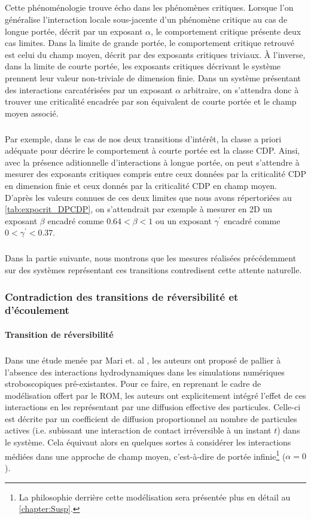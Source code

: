 \subparagraph{}Cette phénoménologie trouve écho dans les phénomènes critiques. Lorsque l'on généralise l'interaction locale sous-jacente d'un phénomène critique au cas de longue portée, décrit par un exposant $\alpha$, le comportement critique présente deux cas limites. Dans la limite de grande portée, le comportement critique retrouvé est celui du champ moyen, décrit par des exposants critiques triviaux. \`A l'inverse, dans la limite de courte portée, les exposants critiques décrivant le système prennent leur valeur non-triviale de dimension finie. Dans un système présentant des interactions carcatérisées par un exposant $\alpha$ arbitraire, on s'attendra donc à trouver une criticalité encadrée par son équivalent de courte portée et le champ moyen associé.

\subparagraph{}Par exemple, dans le cas de nos deux transitions d'intérêt, la classe a priori adéquate pour décrire le comportement à courte portée est la classe CDP. Ainsi, avec la présence aditionnelle d'interactions à longue portée, on peut s'attendre à mesurer des exposants critiques compris entre ceux données par la criticalité CDP en dimension finie et ceux donnés par la criticalité CDP en champ moyen. D'après les valeurs connues de ces deux limites que nous avons répertoriées au \autoref{tab:expocrit_DPCDP}, on s'attendrait par exemple à mesurer en 2D un exposant $\beta$ encadré comme $0.64 < \beta < 1$ ou un exposant $\gamma^\prime$ encadré comme $0 < \gamma^\prime < 0.37$.

\subparagraph{}Dans la partie suivante, nous montrons que les mesures réalisées précédemment sur des systèmes représentant ces transitions contredisent cette attente naturelle.

\subsubsection{Contradiction des transitions de réversibilité et d'écoulement}

\paragraph{Transition de réversibilité}

\subparagraph{}Dans une étude menée par Mari et. al \cite{mari_absorbing_2022}, les auteurs ont proposé de pallier à l'absence des interactions hydrodynamiques dans les simulations numériques stroboscopiques pré-existantes. Pour ce faire, en reprenant le cadre de modélisation offert par le ROM, les auteurs ont explicitement intégré l'effet de ces interactions en les représentant par une diffusion effective des particules. Celle-ci est décrite par un coefficient de diffusion proportionnel au nombre de particules actives (i.e. subissant une interaction de contact irréversible à un instant $t$) dans le système. Cela équivaut alors en quelques sortes à considérer les interactions médiées dans une approche de champ moyen, c'est-à-dire de portée infinie\footnote{La philosophie derrière cette modélisation sera présentée plus en détail au \autoref{chapter:Susp}.} ($\alpha = 0$). 

